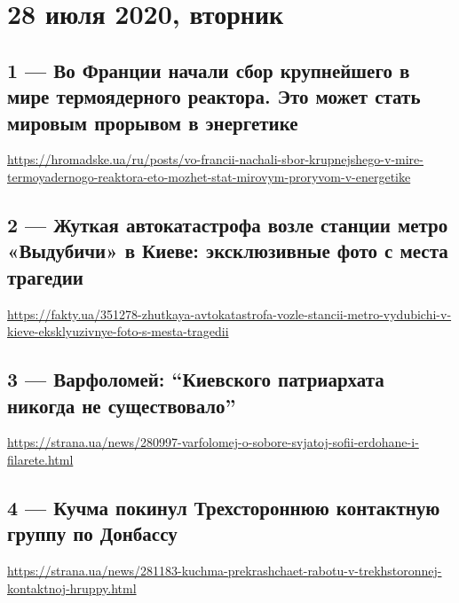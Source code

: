  

\clearpage
\section{28 июля 2020, вторник}
\label{sec:28_07_2020}


\subsection{1 --- Во Франции начали сбор крупнейшего в мире термоядерного
реактора. Это может стать мировым прорывом в энергетике}

\url{https://hromadske.ua/ru/posts/vo-francii-nachali-sbor-krupnejshego-v-mire-termoyadernogo-reaktora-eto-mozhet-stat-mirovym-proryvom-v-energetike}

\subsection{2 --- Жуткая автокатастрофа возле станции метро «Выдубичи» в Киеве: эксклюзивные фото с места трагедии}
\url{https://fakty.ua/351278-zhutkaya-avtokatastrofa-vozle-stancii-metro-vydubichi-v-kieve-eksklyuzivnye-foto-s-mesta-tragedii}

\subsection{3 --- Варфоломей: ``Киевского патриархата никогда не существовало''}
\url{https://strana.ua/news/280997-varfolomej-o-sobore-svjatoj-sofii-erdohane-i-filarete.html}

\subsection{4 --- Кучма покинул Трехстороннюю контактную группу по Донбассу}
\url{https://strana.ua/news/281183-kuchma-prekrashchaet-rabotu-v-trekhstoronnej-kontaktnoj-hruppy.html}

